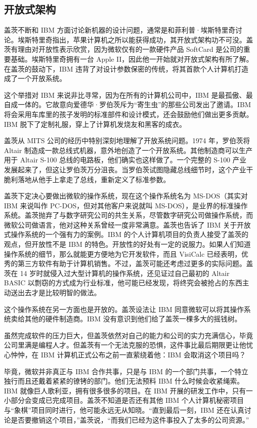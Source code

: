 \documentclass[12pt,UTF8]{ctexbook}
\begin{document}
\subsection{开放式架构}


盖茨不断和 IBM 方面讨论新机器的设计问题，通常是和菲利普·埃斯特里奇讨论。埃斯特里奇指出，苹果计算机之所以能获得成功，其开放式架构功不可没。盖茨有理由对开放性表示欣赏，因为微软仅有的一款硬件产品 SoftCard 是公司的重要基础。埃斯特里奇拥有一台 Apple II，因此他一开始就对开放式架构有所了解。在盖茨的鼓动下，IBM 违背了对设计参数保密的传统，将其首款个人计算机打造成了一个开放系统。

这个举措对 IBM 来说非比寻常，因为在所有的计算机公司中，IBM 是最孤傲、最自成一体的。它故意向爱德华·罗伯茨斥为“寄生虫”的那些公司发出了邀请。IBM 将会采用车库里的孩子发明的标准部件和设计模式，还会鼓励他们做出更多贡献。IBM 脱下了定制礼服，穿上了计算机发烧友和黑客的成衣。

盖茨从 MITS 公司的经历中特别深刻地理解了开放系统问题。1974 年，罗伯茨将 Altair 制造成一款总线式机器，意外地创造了一个开放系统。其他制造商可以生产用于 Altair S-100 总线的电路板，他们确实也这样做了。一个完整的 S-100 产业发展起来了，但这让罗伯茨万分沮丧。当罗伯茨试图隐藏总线细节时，这个产业干脆利落地从他手上拿走了总线，重新定义了标准参数。

盖茨下定决心要做出微软的操作系统，现在这个操作系统名为 MS-DOS（其实对 IBM 来说叫作 PC-DOS，但对其他客户来说就叫 MS-DOS），是业界的标准操作系统。盖茨抛弃了与数字研究公司的共生关系，尽管数字研究公司做操作系统，而微软公司做语言，他对这种关系曾经一度非常满意。盖茨也告诉了 IBM 关于开放式操作系统的一个强有力的案例。IBM 的个人计算机项目的负责人接受了盖茨的观点，但开放性不是 IBM 的特色。开放性的好处有一定的说服力。如果人们知道操作系统的细节，那么就能更方便地为它开发软件，而且 VisiCalc 已经表明，优秀的第三方软件有助于计算机销售。不过，盖茨可能还考虑过更多的实际问题。盖茨在 14 岁时就侵入过大型计算机的操作系统，还见证过自己最初的 Altair BASIC 以剽窃的方式成为行业标准，他可能已经发现，将终究会被抢占的东西主动送出去才是比较明智的做法。

这个操作系统在另一方面也是开放的。盖茨设法让 IBM 同意微软可以将其操作系统卖给其他的硬件制造商。IBM 没有意识到他们给了盖茨一棵多大的摇钱树。

虽然完成软件的压力巨大，但盖茨依然对自己的能力和公司的实力充满信心，毕竟公司里满是编程人才。但盖茨有一个无法克服的恐惧，这件事比最后期限更让他忧心忡忡，在 IBM 计算机正式公布之前一直萦绕着他：IBM 会取消这个项目吗？

毕竟，微软并非真正与 IBM 合作共事，只是与 IBM 的一个部门共事，一个特立独行而且还戴着紧紧的镣铐的部门。他们无法预料 IBM 什么时候会收紧绳索。IBM 就像巨人歌利亚，拥有很多很多的项目。在 IBM 开展的研发工作中，只有一小部分会变成已完成项目。盖茨不知道是否还有其他 IBM 个人计算机秘密项目与“象棋”项目同时进行，他可能永远无从知晓。“直到最后一刻，IBM 还在认真讨论是否要撤销这个项目，”盖茨说，“而我们已经为这件事投入了太多的公司资源。”
\end{document}
